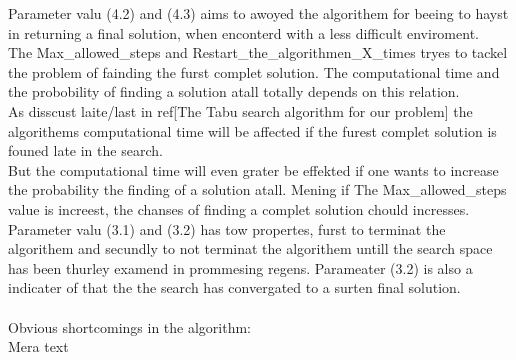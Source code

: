 Parameter valu (4.2) and (4.3) aims to awoyed the algorithem for beeing to hayst in returning a final solution, when enconterd with a less difficult enviroment.\\
The Max\_allowed\_steps and Restart\_the\_algorithmen\_X\_times tryes to tackel the problem of fainding the furst complet solution. The computational time and the probobility of finding a solution atall totally depends on this relation.\\
As disscust laite/last in ref[The Tabu search algorithm for our problem] the algorithems computational time will be affected if the furest complet solution is founed late in the search.\\
But the computational time will even grater be effekted if one wants to increase the probability the finding of a solution atall. Mening if The Max\_allowed\_steps value is increest, the chanses of finding a complet solution chould incresses.\\
Parameter valu (3.1) and (3.2) has tow propertes, furst to terminat the algorithem and secundly to not terminat the algorithem untill the search space has been thurley examend in prommesing regens. Parameater (3.2) is also a indicater of that the the search has convergated to a surten final solution.\\
\\
\indent Obvious shortcomings in the algorithm:\\
Mera text
